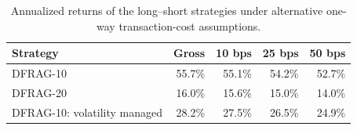 \begin{table}[!htbp]
\centering
\footnotesize
\caption{Annualized returns of the long--short strategies under alternative one-way transaction-cost assumptions.}
\label{tab:long-short-cost-sensitivity}
\begin{tabular}{lrrrr}
\toprule
Strategy & Gross & 10 bps & 25 bps & 50 bps \\
\midrule
DFRAG-10 & 55.7\% & 55.1\% & 54.2\% & 52.7\% \\
DFRAG-20 & 16.0\% & 15.6\% & 15.0\% & 14.0\% \\
DFRAG-10: volatility managed & 28.2\% & 27.5\% & 26.5\% & 24.9\% \\
\bottomrule
\end{tabular}
\end{table}
